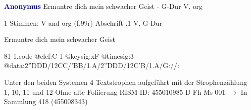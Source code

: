 \documentclass[twocolumn]{book}
\begin{document}
\newline \par \vspace{7pt} \textcolor{darkblue}{\textbf{Anonymus  }}
\newline Ermuntre dich mein schwacher Geist - G-Dur
\newline V, org
\newline \begin{itshape}\end{itshape} 
\newline \textcolor{darkblue}{}  1 Stimmen: V and org  (f.99r)
\newline Abschrift
.1  V, G-Dur
\newline \begin{footnotesize} Ermuntre dich mein schwacher Geist \end{footnotesize}  
\begin{filecontents*}{81-1.code}
@clef:C-1
@keysig:xF
@timesig:3
@data:2''DDD/12CC/'BB/1.A/2''DDD/12C'B/1.A/G://:
\end{filecontents*}
\newline
%
\newline Unter den beiden Systemen 4 Textstrophen aufgeführt mit der Strophenzählung 1, 10, 11 und 12
\newline Ohne alte Foliierung
\newline RISM-ID: 455010985
\newline D-Fh  Ms 001
\newline $\rightarrow$ In Sammlung 418 (455008343)
      
\end{document}
